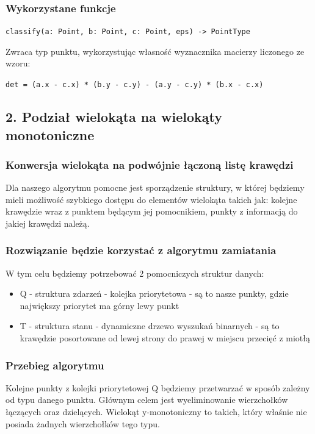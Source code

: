 \documentclass[12pt]{article}
\begin{document}
\subsubsection*{Wykorzystane funkcje}
\verb|classify(a: Point, b: Point, c: Point, eps) -> PointType|

Zwraca typ punktu, wykorzystując własność wyznacznika macierzy liczonego ze wzoru:

\verb|det = (a.x - c.x) * (b.y - c.y) - (a.y - c.y) * (b.x - c.x)|

\newpage

\subsection*{2. Podział wielokąta na wielokąty monotoniczne}
\subsubsection*{Konwersja wielokąta na podwójnie łączoną listę krawędzi}
Dla naszego algorytmu pomocne jest sporządzenie struktury, w której będziemy mieli możliwość szybkiego dostępu do elementów wielokąta takich jak: kolejne krawędzie wraz z punktem będącym jej pomocnikiem, punkty z informacją do jakiej krawędzi należą.

\subsubsection*{Rozwiązanie będzie korzystać z algorytmu zamiatania}
W tym celu będziemy potrzebować 2 pomocniczych struktur danych:
\begin{itemize}
	\item Q - struktura zdarzeń - kolejka priorytetowa - są to nasze punkty, gdzie największy priorytet ma górny lewy punkt
	\item T - struktura stanu - dynamiczne drzewo wyszukań binarnych - są to krawędzie posortowane od lewej strony do prawej w miejscu przecięć z miotłą
\end{itemize}

\subsubsection*{Przebieg algorytmu}
Kolejne punkty z kolejki priorytetowej Q będziemy przetwarzać w sposób zależny od typu danego punktu.
Głównym celem jest wyeliminowanie wierzchołków łączących oraz dzielących. Wielokąt y-monotoniczny to takich, który właśnie nie posiada żadnych wierzchołków tego typu.
\end{document}
